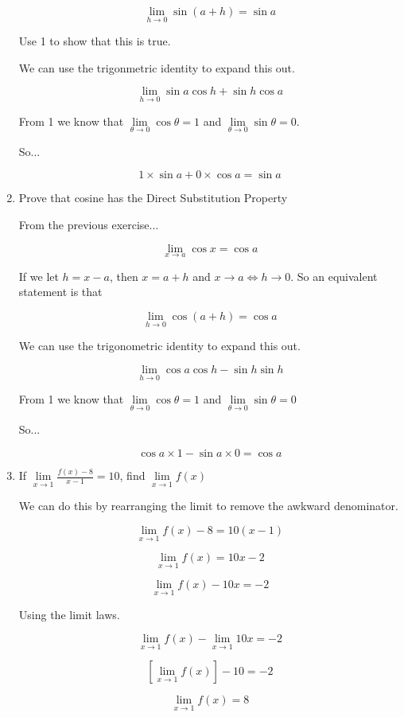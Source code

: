 \documentclass{article}
\begin{document}
\begin{enumerate}
			$$ \lim \limits _{h \to 0} \sin(a+h) = \sin a$$

			Use 1 to show that this is true.

			We can use the trigonmetric identity to expand this out.

			$$\lim \limits _{h \to 0} \sin a \cos h + \sin h \cos a$$

			From 1 we know that $\lim \limits _{\theta \to 0} \cos \theta = 1$
			and $\lim \limits _{\theta \to 0} \sin \theta = 0$.

			So...

			$$1 \times \sin a + 0 \times \cos a = \sin a$$

		\item Prove that cosine has the Direct Substitution Property

		From the previous exercise...

		$$\lim \limits _{x \to a} \cos x = \cos a$$

		If we let $h = x -a$, then $x = a + h$ and $x \to a \Leftrightarrow h \to 0$.
		So an equivalent statement is that

		$$ \lim \limits _{h \to 0} \cos(a+h) = \cos a$$

		We can use the trigonometric identity to expand this out.

		$$\lim \limits _{h \to 0} \cos a \cos h - \sin h \sin h$$

		From 1 we know that $\lim \limits _{\theta \to 0} \cos \theta = 1$
		and $\lim \limits _{\theta \to 0} \sin \theta = 0$

		So...

		$$\cos a \times 1 - \sin a \times 0 = \cos a$$

		\item If $\lim \limits _{x \to 1} \frac{f(x)-8}{x-1} = 10$, find $\lim \limits _{x \to 1} f(x)$

			We can do this by rearranging the limit to remove the awkward denominator.
	
			$$\lim \limits _{x \to 1} f(x) - 8 = 10(x -1)$$

			$$\lim \limits _{x \to 1} f(x) = 10x - 2$$

			$$\lim \limits _{x\to 1} f(x) - 10x = -2$$

			Using the limit laws.

			$$\lim \limits _{x\to 1} f(x) - \lim \limits _{x \to 1} 10x = -2$$

			$$[\lim \limits _{x \to 1} f(x)] -10 = -2$$

			$$\lim \limits _{x \to 1} f(x) = 8$$


\end{enumerate}
\end{document}
